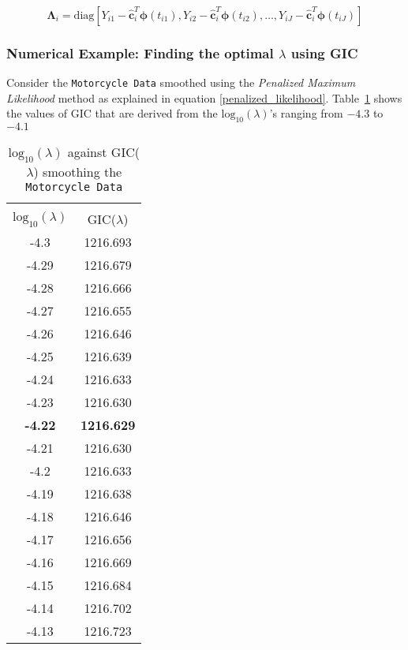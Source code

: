 \begin{equation*}
\bm{\Lambda}_i = \text{diag} \left[Y_{i1} - \bm{\hat{c}}_i^T\bm{\phi}(t_{i1}),Y_{i2} - \bm{\hat{c}}_i^T\bm{\phi}(t_{i2}),\dots,Y_{iJ} - \bm{\hat{c}}^T_i\bm{\phi}(t_{iJ})\right]
\end{equation*}

\subsubsection*{Numerical Example: Finding the optimal $\lambda$ using GIC}
Consider the \texttt{Motorcycle Data} smoothed using the \textit{Penalized Maximum Likelihood} method as explained in equation \eqref{penalized_likelihood}. Table~\ref{table:gic_penml} shows the values of GIC that are derived from the $\text{log}_{10} (\lambda)$'s ranging from $-4.3$ to $-4.1$ 
\begin{table}[ht]
\caption[Minimizing the GIC yields to the optimal $\hat{\lambda}$ using \textit{Penalized Maximum Likelihood} method]{$\text{log}_{10} (\lambda)$ against GIC($\lambda$) smoothing the \texttt{Motorcycle Data}} 
\centering %
\begin{tabular}{c c } %
\hline\hline %
&\\[-2ex]
$\text{log}_{10} (\lambda)$ & GIC($\lambda$) \\ [0.5ex] %
\hline\hline 
-4.3	&	1216.693	\\
-4.29	&	1216.679	\\
-4.28	&	1216.666	\\
-4.27	&	1216.655	\\
-4.26	&	1216.646	\\
-4.25	&	1216.639	\\
-4.24	&	1216.633	\\
-4.23	&	1216.630	\\
\textbf{-4.22}	&	\textbf{1216.629}	\\
-4.21	&	1216.630	\\
-4.2	&	1216.633	\\
-4.19	&	1216.638	\\
-4.18	&	1216.646	\\
-4.17	&	1216.656	\\
-4.16	&	1216.669	\\
-4.15	&	1216.684	\\
-4.14	&	1216.702	\\
-4.13	&	1216.723	\\
 [0.25ex] %
\hline %
\end{tabular}
\label{table:gic_penml} %
\end{table}

